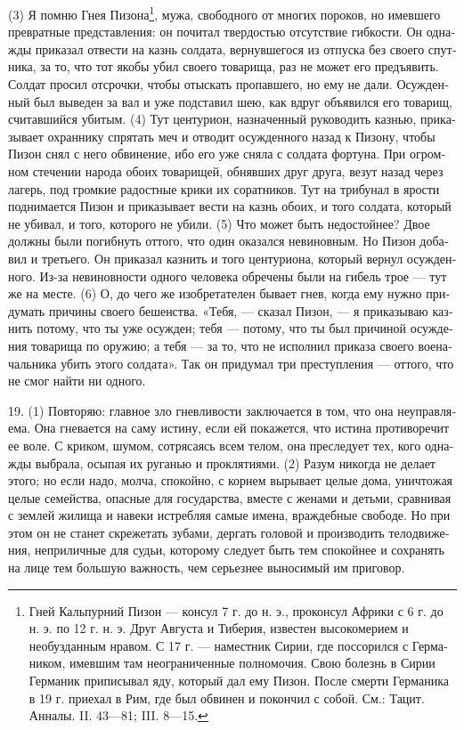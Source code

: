 (3) Я пом­ню Гнея Пизона\footnote{Гней Каль­пур­ний Пизон --- кон­сул 7 г. до н. э., про­кон­сул Афри­ки с 6 г. до н. э. по 12 г. н. э. Друг Авгу­ста и Тибе­рия, изве­стен высо­ко­ме­ри­ем и необуздан­ным нра­вом. С 17 г. --- намест­ник Сирии, где поссо­рил­ся с Гер­ма­ни­ком, имев­шим там неогра­ни­чен­ные пол­но­мо­чия. Свою болезнь в Сирии Гер­ма­ник при­пи­сы­вал яду, кото­рый дал ему Пизон. После смер­ти Гер­ма­ни­ка в 19 г. при­ехал в Рим, где был обви­нен и покон­чил с собой. См.: Тацит. Анна­лы. II. 43—81; III. 8—15.}, мужа, сво­бод­но­го от мно­гих поро­ков, но имев­ше­го пре­врат­ные пред­став­ле­ния: он почи­тал твер­до­стью отсут­ст­вие гиб­ко­сти. Он одна­жды при­ка­зал отве­сти на казнь сол­да­та, вер­нув­ше­го­ся из отпус­ка без сво­его спут­ни­ка, за то, что тот яко­бы убил сво­его това­ри­ща, раз не может его предъ­явить. Сол­дат про­сил отсроч­ки, чтобы отыс­кать про­пав­ше­го, но ему не дали. Осуж­ден­ный был выведен за вал и уже под­ста­вил шею, как вдруг объ­явил­ся его това­рищ, счи­тав­ший­ся уби­тым. (4) Тут цен­ту­ри­он, назна­чен­ный руко­во­дить каз­нью, при­ка­зы­ва­ет охран­ни­ку спря­тать меч и отво­дит осуж­ден­но­го назад к Пизо­ну, чтобы Пизон снял с него обви­не­ние, ибо его уже сня­ла с сол­да­та фор­ту­на. При огром­ном сте­че­нии наро­да обо­их това­ри­щей, обняв­ших друг дру­га, везут назад через лагерь, под гром­кие радост­ные кри­ки их сорат­ни­ков. Тут на три­бу­нал в яро­сти под­ни­ма­ет­ся Пизон и при­ка­зы­ва­ет вести на казнь обо­их, и того сол­да­та, кото­рый не уби­вал, и того, кото­ро­го не уби­ли. (5) Что может быть недо­стой­нее? Двое долж­ны были погиб­нуть отто­го, что один ока­зал­ся неви­нов­ным. Но Пизон доба­вил и третье­го. Он при­ка­зал каз­нить и того цен­ту­ри­о­на, кото­рый вер­нул осуж­ден­но­го. Из-за неви­нов­но­сти одно­го чело­ве­ка обре­че­ны были на гибель трое --- тут же на месте. (6) О, до чего же изо­бре­та­те­лен быва­ет гнев, когда ему нуж­но при­ду­мать при­чи­ны сво­его бешен­ства. «Тебя, --- ска­зал Пизон, --- я при­ка­зы­ваю каз­нить пото­му, что ты уже осуж­ден; тебя --- пото­му, что ты был при­чи­ной осуж­де­ния това­ри­ща по ору­жию; а тебя --- за то, что не испол­нил при­ка­за сво­его вое­на­чаль­ни­ка убить это­го сол­да­та». Так он при­ду­мал три пре­ступ­ле­ния --- отто­го, что не смог най­ти ни одно­го.

19. (1) Повто­ряю: глав­ное зло гнев­ли­во­сти заклю­ча­ет­ся в том, что она неуправ­ля­е­ма. Она гне­ва­ет­ся на саму исти­ну, если ей пока­жет­ся, что исти­на про­ти­во­ре­чит ее воле. С кри­ком, шумом, сотря­са­ясь всем телом, она пре­сле­ду­ет тех, кого одна­жды выбра­ла, осы­пая их руга­нью и про­кля­ти­я­ми. (2) Разум нико­гда не дела­ет это­го; но если надо, мол­ча, спо­кой­но, с кор­нем выры­ва­ет целые дома, уни­что­жая целые семей­ства, опас­ные для государ­ства, вме­сте с жена­ми и детьми, срав­ни­вая с зем­лей жили­ща и наве­ки истреб­ляя самые име­на, враж­деб­ные сво­бо­де. Но при этом он не станет скре­же­тать зуба­ми, дер­гать голо­вой и про­из­во­дить тело­дви­же­ния, непри­лич­ные для судьи, кото­ро­му сле­ду­ет быть тем спо­кой­нее и сохра­нять на лице тем боль­шую важ­ность, чем серь­ез­нее выно­си­мый им при­го­вор.

